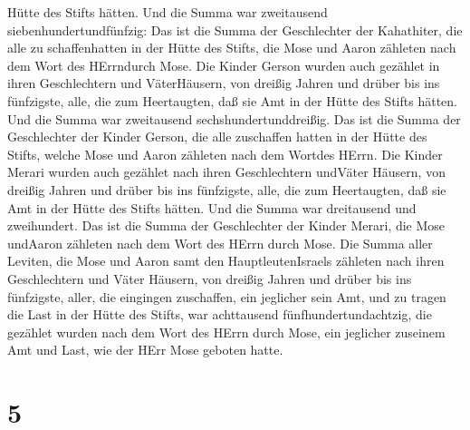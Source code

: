 Hütte des Stifts hätten.  Und die Summa war zweitausend
siebenhundertundfünfzig:  Das ist die Summa der
Geschlechter der Kahathiter, die alle zu schaffenhatten in der Hütte des
Stifts, die Mose und Aaron zähleten nach dem Wort des HErrndurch Mose.
 Die Kinder Gerson wurden auch gezählet in ihren
Geschlechtern und VäterHäusern,  von dreißig Jahren und
drüber bis ins fünfzigste, alle, die zum Heertaugten, daß sie Amt in der
Hütte des Stifts hätten.  Und die Summa war zweitausend
sechshundertunddreißig.  Das ist die Summa der Geschlechter
der Kinder Gerson, die alle zuschaffen hatten in der Hütte des Stifts,
welche Mose und Aaron zähleten nach dem Wortdes HErrn.  Die
Kinder Merari wurden auch gezählet nach ihren Geschlechtern undVäter
Häusern,  von dreißig Jahren und drüber bis ins fünfzigste,
alle, die zum Heertaugten, daß sie Amt in der Hütte des Stifts hätten.
 Und die Summa war dreitausend und zweihundert.
 Das ist die Summa der Geschlechter der Kinder Merari, die
Mose undAaron zähleten nach dem Wort des HErrn durch Mose. 
Die Summa aller Leviten, die Mose und Aaron samt den HauptleutenIsraels
zähleten nach ihren Geschlechtern und Väter Häusern,  von
dreißig Jahren und drüber bis ins fünfzigste, aller, die eingingen
zuschaffen, ein jeglicher sein Amt, und zu tragen die Last in der Hütte
des Stifts,  war achttausend fünfhundertundachtzig,
 die gezählet wurden nach dem Wort des HErrn durch Mose,
ein jeglicher zuseinem Amt und Last, wie der HErr Mose geboten hatte.

\hypertarget{section-4}{%
\section{5}\label{section-4}}


